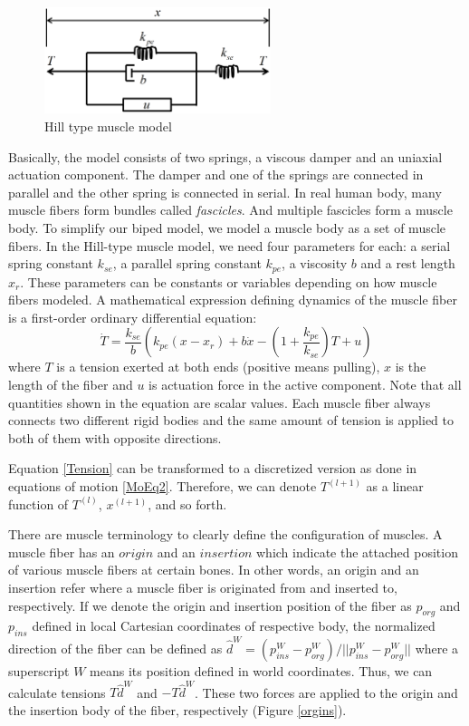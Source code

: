 \documentclass[master,english,final]{kaist-ucs}
\begin{document}
\begin{figure}[h!]
  \centering
  \includegraphics[width=2.6in]{musclemodel}
  \caption{Hill type muscle model}
  \label{hilltype}
\end{figure}
\noindent Basically, the model consists of two springs, a viscous damper and an uniaxial actuation component.
The damper and one of the springs are connected in parallel and the other spring is
connected in serial.
In real human body, many muscle fibers form bundles called \textit{fascicles}.
And multiple fascicles form a muscle body.
To simplify our biped model, we model a muscle body as a set of muscle fibers.
In the Hill-type muscle model, we need four parameters for each:
a serial spring constant $k_{se}$, a parallel spring constant $k_{pe}$, a viscosity $b$ and a rest length $x_{r}$.
These parameters can be constants or variables depending on how muscle fibers modeled.
A mathematical expression defining dynamics of the muscle fiber is a first-order ordinary differential equation:
\begin{equation}\label{Tension}
\dot{T} = \frac{k_{se}}{b} \left( k_{pe}(x-x_{r})+b\dot{x}-\left(1+\frac{k_{pe}}{k_{se}}\right)T+u   \right)
\end{equation}
where $T$ is a tension exerted at both ends (positive means pulling),
$x$ is the length of the fiber and $u$ is actuation force in the active component.
Note that all quantities shown in the equation are scalar values.
Each muscle fiber always connects two different rigid bodies and the same amount of
tension is applied to both of them with opposite directions.

Equation \eqref{Tension} can be transformed to a discretized version as done in equations of motion \eqref{MoEq2}.
Therefore, we can denote $T^{(l+1)}$ as a linear function of $T^{(l)}$, $x^{(l+1)}$, and so forth.

There are muscle terminology to clearly define the configuration of muscles.
A muscle fiber has an $origin$ and an $insertion$ which indicate the attached position
of various muscle fibers at certain bones.
In other words, an origin and an insertion refer where a muscle fiber is originated from and inserted to, respectively.
If we denote the origin and insertion position of the fiber as $p_{org}$ and $p_{ins}$ defined in
local Cartesian coordinates of respective body,
the normalized direction of the fiber can be defined as
$\hat{d}^{W}=(p^{W}_{ins}-p^{W}_{org})/||p^{W}_{ins}-p^{W}_{org}||$ where
a superscript $W$ means its position defined in world coordinates.
Thus, we can calculate tensions $T\hat{d}^{W}$ and $-T\hat{d}^{W}$.
These two forces are applied to the origin and the insertion body of the fiber, respectively (Figure \ref{orgins}).
\end{document}
